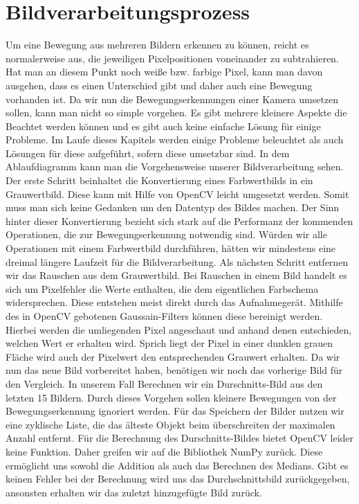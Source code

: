 \section{Bildverarbeitungsprozess}
Um eine Bewegung aus mehreren Bildern erkennen zu können, reicht es normalerweise aus, die jeweiligen Pixelpositionen voneinander zu subtrahieren. Hat man an diesem Punkt noch weiße bzw. farbige Pixel, kann man davon ausgehen, dass es einen Unterschied gibt und daher auch eine Bewegung vorhanden ist. Da wir nun die Bewegungserkennungen einer Kamera umsetzen sollen, kann man nicht so simple vorgehen. Es gibt mehrere kleinere Aspekte die Beachtet werden können und es gibt auch keine einfache Lösung für einige Probleme. Im Laufe dieses Kapitels werden einige Probleme beleuchtet als auch Lösungen für diese aufgeführt, sofern diese umsetzbar sind. 
In dem Ablaufdiagramm kann man die Vorgehensweise unserer Bildverarbeitung sehen. Der erste Schritt beinhaltet die Konvertierung eines Farbwertbilds in ein Grauwertbild. Diese kann mit Hilfe von OpenCV leicht umgesetzt werden. Somit muss man sich keine Gedanken um den Datentyp des Bildes machen. Der Sinn hinter dieser Konvertierung bezieht sich stark auf die Performanz der kommenden Operationen, die zur Bewegungserkennung notwendig sind. Würden wir alle Operationen mit einem Farbwertbild durchführen, hätten wir mindestens eine dreimal längere Laufzeit für die Bildverarbeitung.
Als nächsten Schritt entfernen wir das Rauschen aus dem Grauwertbild. Bei Rauschen in einem Bild handelt es sich um Pixelfehler die Werte enthalten, die dem eigentlichen Farbschema widersprechen. Diese entstehen meist direkt durch das Aufnahmegerät. Mithilfe des in OpenCV gebotenen Gaussain-Filters können diese bereinigt werden. Hierbei werden die umliegenden Pixel angeschaut und anhand denen entschieden, welchen Wert er erhalten wird. Sprich liegt der Pixel in einer dunklen grauen Fläche wird auch der Pixelwert den entsprechenden Grauwert erhalten.
Da wir nun das neue Bild vorbereitet haben, benötigen wir noch das vorherige Bild für den Vergleich. In unserem Fall Berechnen wir ein Durschnitts-Bild aus den letzten 15 Bildern. Durch dieses Vorgehen sollen kleinere Bewegungen von der Bewegungserkennung ignoriert werden. Für das Speichern der Bilder nutzen wir eine zyklische Liste, die das älteste Objekt beim überschreiten der maximalen Anzahl entfernt. Für die Berechnung des Durschnitts-Bildes bietet OpenCV leider keine Funktion. Daher greifen wir auf die Bibliothek NumPy zurück. Diese ermöglicht uns sowohl die Addition als auch das Berechnen des Medians. Gibt es keinen Fehler bei der Berechnung wird uns das Durchschnittsbild zurückgegeben, ansonsten erhalten wir das zuletzt hinzugefügte Bild zurück.
